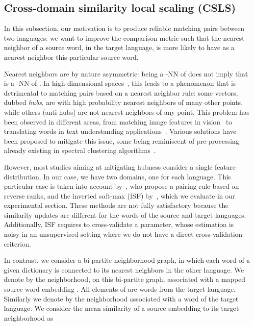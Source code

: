 \documentclass{article} \usepackage{iclr2018_conference,times}
\newcommand{\hub}{CSLS\xspace}
\newcommand{\isf}{ISF\xspace}
\begin{document}
\subsection{Cross-domain similarity local scaling (\hub)}
\label{sec:hub}

\def\t{t}
\def\s{s}
\def\T{\mathrm{T}}
\def\S{\mathrm{S}}

In this subsection, our motivation is to produce reliable matching pairs between two languages: we want to improve the comparison metric such that the nearest neighbor of a source word, in the target language, is more likely to have as a nearest neighbor this particular source word. 

Nearest neighbors are by nature asymmetric:  being a -NN of  does not imply that  is a -NN of . 
In high-dimensional spaces~\citep{radovanovic2010hubs}, this leads to a  phenomenon that is detrimental to matching pairs based on a nearest neighbor rule: some vectors, dubbed {\it hubs}, are with high probability nearest neighbors of many other points, while others (anti-hubs) are not nearest neighbors of any point. 
This problem has been observed in different areas, from matching image features in vision~\citep{jegou2010accurate} to translating words in text understanding applications~\citep{dinu2014improving}. 
Various solutions have been proposed to mitigate this issue, some being reminiscent of pre-processing already existing in spectral clustering algorithms~\citep{zelnik2005selftuning}.

However, most studies aiming at mitigating hubness consider a single feature distribution. In our case, we have two domains, one for each language. This particular case is taken into account by~\cite{dinu2014improving}, who propose a pairing rule based on reverse ranks, and the inverted soft-max (\isf) by~\cite{smith2017offline}, which we evaluate in our experimental section. 
These methods are not fully satisfactory because the similarity updates are different for the words of the source and target languages. Additionally, \isf requires to cross-validate a parameter, whose estimation is noisy in an unsupervised setting where we do not have a direct cross-validation criterion. 


In contrast, we consider a bi-partite neighborhood graph, in which each word of a given dictionary is connected to its  nearest neighbors in the other language. We denote by  the neighborhood, on this bi-partite graph, associated with a mapped source word embedding . All  elements of  are words from the target language. Similarly we denote by  the neighborhood associated with a word  of the target language. 
We consider the mean similarity of a source embedding  to its target neighborhood as
\end{document}
